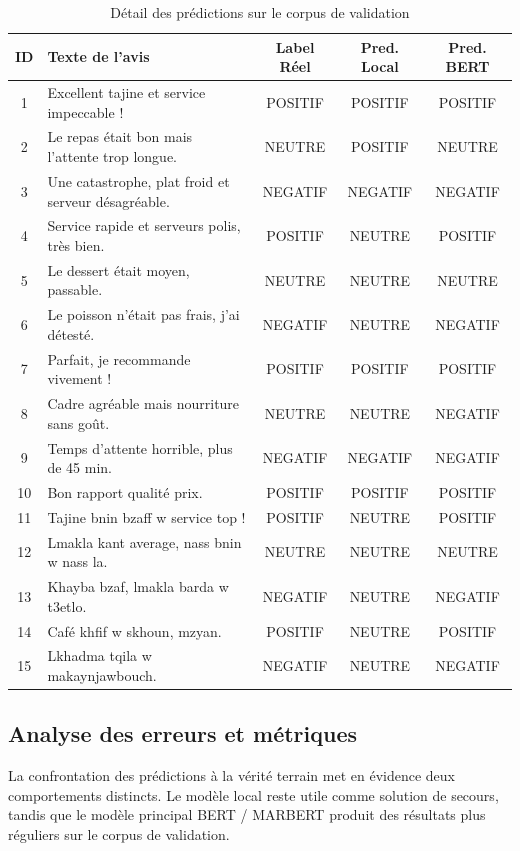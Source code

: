\begin{table}[H]
\centering
\caption{Détail des prédictions sur le corpus de validation}
\label{tab:evaluation-corpus}
\begin{tabularx}{\textwidth}{c p{5.5cm} c c c}
\toprule
\textbf{ID} & \textbf{Texte de l'avis} & \textbf{Label Réel} & \textbf{Pred. Local} & \textbf{Pred. BERT} \\
\midrule
1 & Excellent tajine et service impeccable ! & POSITIF & POSITIF & POSITIF \\
2 & Le repas était bon mais l'attente trop longue. & NEUTRE & POSITIF & NEUTRE \\
3 & Une catastrophe, plat froid et serveur désagréable. & NEGATIF & NEGATIF & NEGATIF \\
4 & Service rapide et serveurs polis, très bien. & POSITIF & NEUTRE & POSITIF \\
5 & Le dessert était moyen, passable. & NEUTRE & NEUTRE & NEUTRE \\
6 & Le poisson n'était pas frais, j'ai détesté. & NEGATIF & NEUTRE & NEGATIF \\
7 & Parfait, je recommande vivement ! & POSITIF & POSITIF & POSITIF \\
8 & Cadre agréable mais nourriture sans goût. & NEUTRE & NEUTRE & NEGATIF \\
9 & Temps d'attente horrible, plus de 45 min. & NEGATIF & NEGATIF & NEGATIF \\
10 & Bon rapport qualité prix. & POSITIF & POSITIF & POSITIF \\
11 & Tajine bnin bzaff w service top ! & POSITIF & NEUTRE & POSITIF \\
12 & Lmakla kant average, nass bnin w nass la. & NEUTRE & NEUTRE & NEUTRE \\
13 & Khayba bzaf, lmakla barda w t3etlo. & NEGATIF & NEUTRE & NEGATIF \\
14 & Café khfif w skhoun, mzyan. & POSITIF & NEUTRE & POSITIF \\
15 & Lkhadma tqila w makaynjawbouch. & NEGATIF & NEUTRE & NEGATIF \\
\bottomrule
\end{tabularx}
\end{table}

\subsection{Analyse des erreurs et métriques}
La confrontation des prédictions à la vérité terrain met en évidence deux comportements distincts. Le modèle local reste utile comme solution de secours, tandis que le modèle principal BERT / MARBERT produit des résultats plus réguliers sur le corpus de validation.

